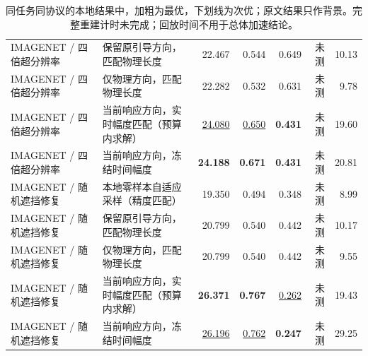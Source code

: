 \begin{table}[t]
{\begin{tabular}{llrrrrr}
IMAGENET / 四倍超分辨率 & 保留原引导方向，匹配物理长度 & 22.467 & 0.544 & 0.649 & 未测 & 10.13 \\
IMAGENET / 四倍超分辨率 & 仅物理方向，匹配物理长度 & 22.282 & 0.532 & 0.631 & 未测 & 9.78 \\
IMAGENET / 四倍超分辨率 & 当前响应方向，实时幅度匹配（预算内求解） & \underline{24.080} & \underline{0.650} & \textbf{0.431} & 未测 & 19.60 \\
IMAGENET / 四倍超分辨率 & 当前响应方向，冻结时间幅度 & \textbf{24.188} & \textbf{0.671} & \textbf{0.431} & 未测 & 20.81 \\
IMAGENET / 随机遮挡修复 & 本地零样本自适应采样（精度匹配） & 19.350 & 0.494 & 0.348 & 未测 & 8.99 \\
IMAGENET / 随机遮挡修复 & 保留原引导方向，匹配物理长度 & 20.799 & 0.540 & 0.442 & 未测 & 10.17 \\
IMAGENET / 随机遮挡修复 & 仅物理方向，匹配物理长度 & 20.799 & 0.540 & 0.442 & 未测 & 9.55 \\
IMAGENET / 随机遮挡修复 & 当前响应方向，实时幅度匹配（预算内求解） & \textbf{26.371} & \textbf{0.767} & \underline{0.262} & 未测 & 19.43 \\
IMAGENET / 随机遮挡修复 & 当前响应方向，冻结时间幅度 & \underline{26.196} & \underline{0.762} & \textbf{0.247} & 未测 & 29.25 \\
\bottomrule
\end{tabular}}
\caption{同任务同协议的本地结果中，加粗为最优，下划线为次优；原文结果只作背景。完整重建计时未完成；回放时间不用于总体加速结论。}
\label{tab:module-ablations}
\end{table}
